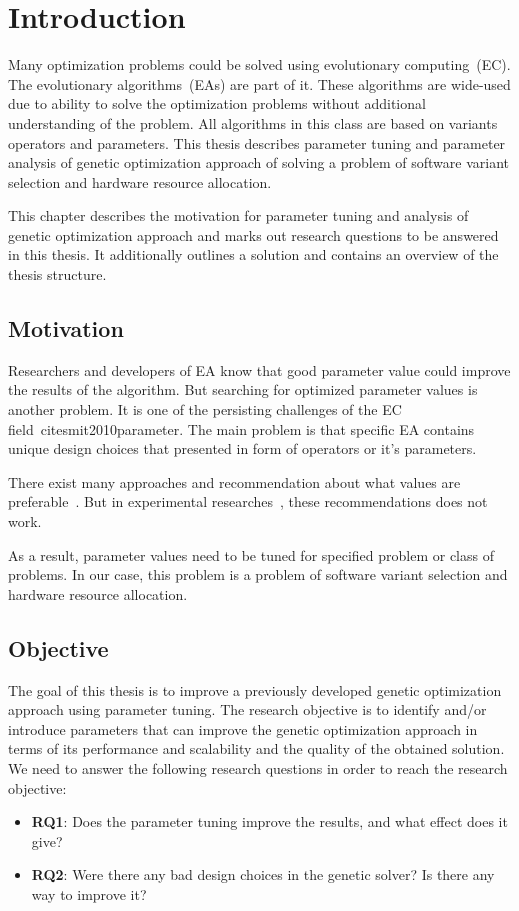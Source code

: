 \chapter{Introduction}\label{intro}

Many optimization problems could be solved using evolutionary computing~(EC). The evolutionary algorithms~(EAs) are part of it. These algorithms are wide-used due to ability to solve the optimization problems without additional understanding of the problem. All algorithms in this class are based on variants operators and parameters. This thesis describes parameter tuning and parameter analysis of genetic optimization approach of solving a problem of software variant selection and hardware resource allocation.  

This chapter describes the motivation for parameter tuning and analysis of genetic optimization approach and marks out research questions to be answered in this thesis. It additionally outlines a solution and contains an overview of the thesis structure.

\section{Motivation}
Researchers and developers of EA know that good parameter value could improve the results of the algorithm. But searching for optimized parameter values is another problem. It is one of the persisting challenges of the EC field~cite{smit2010parameter}. The main problem is that specific EA contains unique design choices that presented in form of operators or it's parameters. 

There exist many approaches and recommendation about what values are preferable~\cite{de2007parameter, sipper2018investigating}. But in experimental researches~\cite{de2007parameter, shahookar1990genetic, gockel1997influencing}, these recommendations does not work. 

As a result, parameter values need to be tuned for specified problem or class of problems. In our case, this problem is a problem of software variant selection and hardware resource allocation. 


\section{Objective}
The goal of this thesis is to improve a previously developed genetic optimization approach using parameter tuning.
The research objective is to identify and/or introduce parameters that can improve the genetic optimization approach in terms of its performance and scalability and the quality of the obtained solution. We need to answer the following research questions in order to reach the research objective: 
\begin{itemize}
	\item \textbf{RQ1}: Does the parameter tuning improve the results, and what effect does it give?
	\item \textbf{RQ2}: Were there any bad design choices in the genetic solver? Is there any way to improve it?
\end{itemize}

